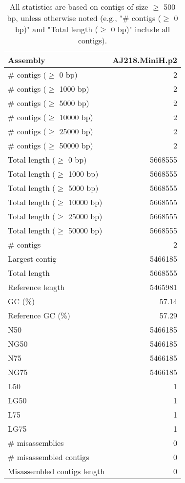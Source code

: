 \documentclass[12pt,a4paper]{article}
\begin{document}
\begin{table}[ht]
\begin{center}
\caption{All statistics are based on contigs of size $\geq$ 500 bp, unless otherwise noted (e.g., "\# contigs ($\geq$ 0 bp)" and "Total length ($\geq$ 0 bp)" include all contigs).}
\begin{tabular}{|l*{1}{|r}|}
\hline
Assembly & AJ218.MiniH.p2 \\ \hline
\# contigs ($\geq$ 0 bp) & 2 \\ \hline
\# contigs ($\geq$ 1000 bp) & 2 \\ \hline
\# contigs ($\geq$ 5000 bp) & 2 \\ \hline
\# contigs ($\geq$ 10000 bp) & 2 \\ \hline
\# contigs ($\geq$ 25000 bp) & 2 \\ \hline
\# contigs ($\geq$ 50000 bp) & 2 \\ \hline
Total length ($\geq$ 0 bp) & 5668555 \\ \hline
Total length ($\geq$ 1000 bp) & 5668555 \\ \hline
Total length ($\geq$ 5000 bp) & 5668555 \\ \hline
Total length ($\geq$ 10000 bp) & 5668555 \\ \hline
Total length ($\geq$ 25000 bp) & 5668555 \\ \hline
Total length ($\geq$ 50000 bp) & 5668555 \\ \hline
\# contigs & 2 \\ \hline
Largest contig & 5466185 \\ \hline
Total length & 5668555 \\ \hline
Reference length & 5465981 \\ \hline
GC (\%) & 57.14 \\ \hline
Reference GC (\%) & 57.29 \\ \hline
N50 & 5466185 \\ \hline
NG50 & 5466185 \\ \hline
N75 & 5466185 \\ \hline
NG75 & 5466185 \\ \hline
L50 & 1 \\ \hline
LG50 & 1 \\ \hline
L75 & 1 \\ \hline
LG75 & 1 \\ \hline
\# misassemblies & 0 \\ \hline
\# misassembled contigs & 0 \\ \hline
Misassembled contigs length & 0 \\ \hline

\end{tabular}
\end{center}
\end{table}
\end{document}
